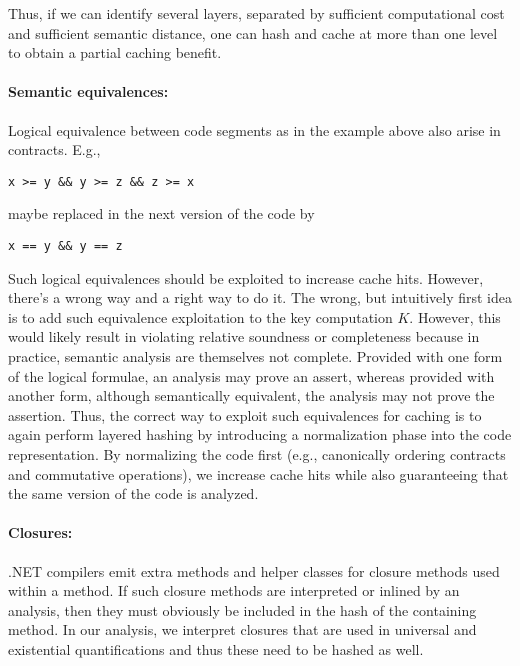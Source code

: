 \documentclass{llncs}
\begin{document}
Thus, if we can
identify several layers, separated by sufficient computational cost
and sufficient semantic distance, one can hash and cache at more than
one level to obtain a partial caching benefit.

\paragraph{Semantic equivalences:} Logical equivalence between code
segments as in the example above also arise in contracts. E.g., 
\begin{lstlisting}
x >= y && y >= z && z >= x
\end{lstlisting}
maybe replaced in the next version of the code by
\begin{lstlisting}
x == y && y == z
\end{lstlisting}
Such logical equivalences should be exploited to increase cache
hits. However, there's a wrong way and a right way to do it. The
wrong, but intuitively first idea is to add such equivalence
exploitation to the key computation $K$. However, this would likely
result in violating relative soundness or completeness because in
practice, semantic analysis are themselves not complete. Provided with
one form of the logical formulae, an analysis may prove an assert,
whereas provided with another form, although semantically equivalent,
the analysis may not prove the assertion.  Thus, the correct way to
exploit such equivalences for caching is to again perform layered
hashing by introducing a normalization phase into the code
representation. By normalizing the code first (e.g., canonically
ordering contracts and commutative operations), we increase
cache hits while also guaranteeing that the same version of the code is
analyzed.

\paragraph{Closures:} .NET compilers emit extra methods and helper classes
 for closure methods used within a method. If such closure methods are
 interpreted or inlined by an analysis, then they must obviously be
 included in the hash of the containing method. In our analysis, we
 interpret closures that are used in universal and existential
 quantifications and thus these need to be hashed as well.
\end{document}
